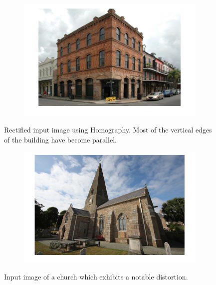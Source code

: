 \documentclass{paper}
\begin{document}
\begin{figure}[H]
    \centering
    \begin{subfigure}{1.0\textwidth}
        \includegraphics[width=\textwidth]{rectify/rectified_building}
    \end{subfigure}
    
    \caption{Rectified input image using Homography. Most of the vertical edges of the building have become parallel. }
    \label{fig:rectified_building}       
\end{figure}


\begin{figure}[H]
    \centering
    \begin{subfigure}{1.0\textwidth}
        \includegraphics[width=\textwidth]{rectify/input_skewed_church}
    \end{subfigure}
    
    \caption{Input image of a church which exhibits a notable distortion.}
    \label{fig:rectify_input_skewed_church}       
\end{figure}
\end{document}
